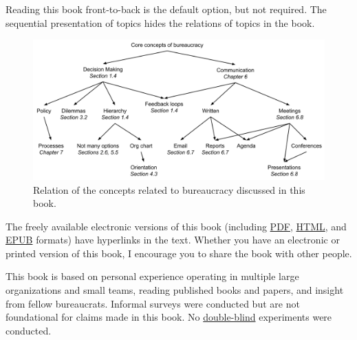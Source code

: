 Reading this book front-to-back is the default option, but not required. The sequential presentation of topics hides the relations of topics in the book. %

\begin{figure}[ht]
    \centering
    \includegraphics[width=1\textwidth]{images/core_concepts_map.pdf}
    \caption{Relation of the concepts related to bureaucracy discussed in this book.}
    \label{fig:core-concepts}
\end{figure}



The freely available electronic versions of this book (including 
\iftoggle{WPinmargin}{\marginpar{$>$Wikipedia: PDF}}{}
\href{https://en.wikipedia.org/wiki/PDF}{PDF}, 
\href{https://en.wikipedia.org/wiki/HTML}{HTML}, and 
\href{https://en.wikipedia.org/wiki/EPUB}{EPUB} 
formats) have hyperlinks in the text. 
\iftoggle{printedonpaper}{}{Light-blue hyperlinks reference external resources like Wikipedia, while dark-blue links reference material within the guide such as the glossary.} Whether you have an electronic or printed version of this book, I encourage you to share the book with other people.


This book is based on personal experience operating in multiple large organizations and small teams, reading published books and papers, and insight from fellow bureaucrats. Informal surveys were conducted but are not foundational for claims made in this book. 
No \href{https://en.wikipedia.org/wiki/Blinded_experiment}{double-blind}%
experiments were conducted. 



